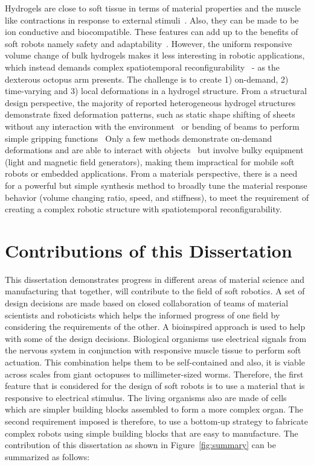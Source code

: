 {Hydrogels are close to soft tissue in terms of material properties and the muscle like contractions in response to external stimuli~\cite{Liu2020}. Also, they can be made to be ion conductive and biocompatible. These features can add up to the benefits of soft robots namely safety and adaptability~\cite{Lee2020}. However, the uniform responsive volume change of bulk hydrogels makes it less interesting in robotic applications, which instead demands complex spatiotemporal reconfigurability~\cite{Erol2019} - as the dexterous octopus arm presents. The challenge is to create 1) on-demand, 2) time-varying and 3) local deformations in a hydrogel structure. From a structural design perspective, the majority of reported heterogeneous hydrogel structures demonstrate fixed deformation patterns, such as static shape shifting of sheets without any interaction with the environment~\cite{SydneyGladman2016, Ma2019, Jeon2017} or bending of beams to perform simple gripping functions~\cite{Wang2017, Ma2018, Duan2017} Only a few methods demonstrate on-demand deformations and are able to interact with objects~\cite{Mourran2017, Palagi2016, Kim2018} but involve bulky equipment (light and magnetic field generators), making them impractical for mobile soft robots or embedded applications.
From a materials perspective, there is a need for a powerful but simple synthesis method to broadly tune the material response behavior (volume changing ratio, speed, and stiffness), to meet the requirement of creating a complex robotic structure with spatiotemporal reconfigurability.

\section{Contributions of this Dissertation}
This dissertation demonstrates progress in different areas of material science and manufacturing  that together, will contribute to the field of soft robotics. A set of design decisions are made based on closed collaboration of teams of material scientists and roboticists which helps the informed progress of one field by considering the requirements of the other. A bioinspired approach is used to help with some of the design decisions. Biological organisms use electrical signals from the nervous system in conjunction with responsive muscle tissue to perform soft actuation. This combination helps them to be self-contained and also, it is viable across scales from giant octopuses to millimeter-sized worms. Therefore, the first feature that is considered for the design of soft robots is to use a material that is responsive to electrical stimulus. The living organisms also are made of cells which are simpler building blocks assembled to form a more complex organ. The second requirement imposed is therefore, to use a bottom-up strategy to fabricate complex robots using simple building blocks that are easy to manufacture. The contribution of this dissertation as shown in Figure~\ref{fig:summary} can be summarized as follows:

}
